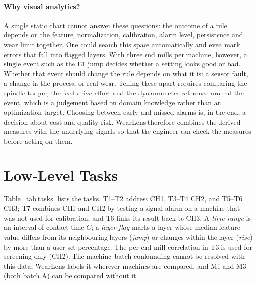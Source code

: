 \paragraph{Why visual analytics?}
A single static chart cannot answer these questions: the outcome of a rule depends on the feature,
normalization, calibration, alarm level, persistence and wear limit together. One could search this space
automatically and even mark errors that fall into flagged layers. With three end mills per machine,
however, a single event such as the E1 jump decides whether a setting looks good or bad. Whether that event
should change the rule depends on what it is: a sensor fault, a change in the process, or real wear. Telling
these apart requires comparing the spindle torque, the feed-drive effort and the dynamometer reference
around the event, which is a judgement based on domain knowledge rather than an optimization target.
Choosing between early and missed alarms is, in the end, a decision about cost and quality risk. WearLens therefore
combines the derived measures with the underlying signals so that the engineer can check the measures
before acting on them.

\section{Low-Level Tasks}
Table~\ref{tab:tasks} lists the tasks. T1--T2 address CH1, T3--T4 CH2, and T5--T6 CH3; T7 combines CH1
and CH2 by testing a signal alarm on a machine that was not used for calibration, and T6 links its result back
to CH3. A \emph{time range} is an interval of contact time $C$; a \emph{layer flag} marks a layer whose median
feature value differs from its neighbouring layers (\emph{jump}) or changes within the layer (\emph{rise}) by
more than a user-set percentage. The per-end-mill correlation in T3 is used for screening only (CH2).
The machine--batch confounding cannot be resolved with this data; WearLens labels it wherever machines
are compared, and M1 and M3 (both batch A) can be compared without it.

